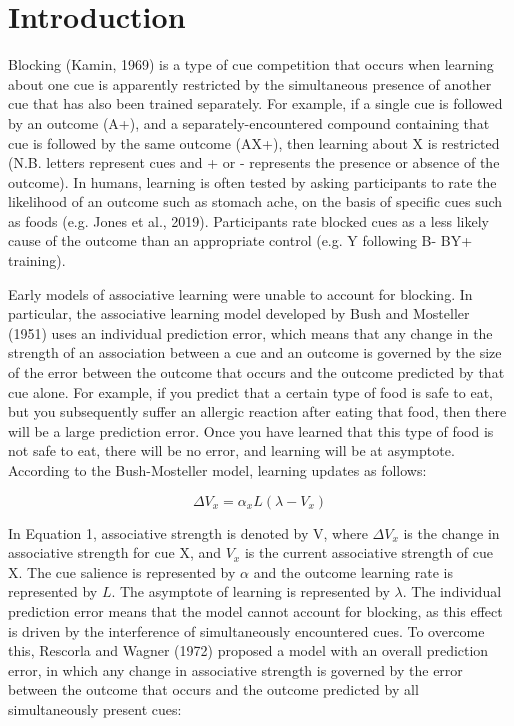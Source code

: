 \documentclass[twocolumn]{article}
\begin{document}
{\renewcommand{\thefootnote}{}
}

\saythanks

\setlength{\baselineskip}{12pt plus.2pt}

\section{Introduction}

Blocking (Kamin, 1969) is a type of cue competition that occurs when
learning about one cue is apparently restricted by the simultaneous
presence of another cue that has also been trained separately. For
example, if a single cue is followed by an outcome (A+), and a
separately-encountered compound containing that cue is followed by the
same outcome (AX+), then learning about X is restricted (N.B. letters
represent cues and + or - represents the presence or absence of the
outcome). In humans, learning is often tested by asking participants to
rate the likelihood of an outcome such as stomach ache, on the basis of
specific cues such as foods (e.g. Jones et al., 2019). Participants rate
blocked cues as a less likely cause of the outcome than an appropriate
control (e.g. Y following B- BY+ training).

Early models of associative learning were unable to account for
blocking. In particular, the associative learning model developed by
Bush and Mosteller (1951) uses an individual prediction error, which
means that any change in the strength of an association between a cue
and an outcome is governed by the size of the error between the outcome
that occurs and the outcome predicted by that cue alone. For example, if
you predict that a certain type of food is safe to eat, but you
subsequently suffer an allergic reaction after eating that food, then
there will be a large prediction error. Once you have learned that this
type of food is not safe to eat, there will be no error, and learning
will be at asymptote. According to the Bush-Mosteller model, learning
updates as follows:

\begin{equation}
  \Delta V_{x} = \alpha_{x}L(\lambda-V_{x})
\end{equation}

In Equation 1, associative strength is denoted by V, where
$\Delta V_{x}$ is the change in associative strength for cue X, and
$V_{x}$ is the current associative strength of cue X. The cue
salience is represented by $\alpha$ and the outcome learning rate is
represented by $L$. The asymptote of learning is represented by $\lambda$. The
individual prediction error means that the model cannot account for
blocking, as this effect is driven by the interference of simultaneously
encountered cues. To overcome this, Rescorla and Wagner (1972) proposed
a model with an overall prediction error, in which any change in
associative strength is governed by the error between the outcome that
occurs and the outcome predicted by all simultaneously present cues:
\end{document}
